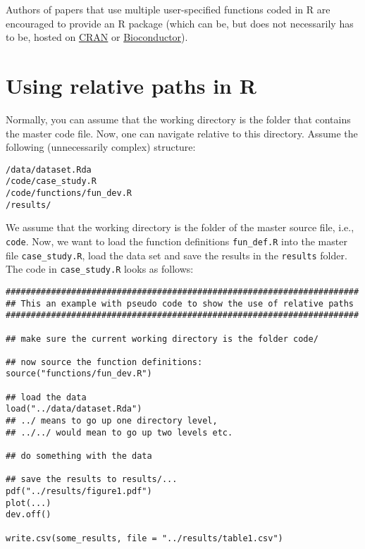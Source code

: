 \documentclass[12pt,a4paper]{article}
\begin{document}
Authors of papers that use multiple user-specified functions coded in \textsf{R}
are encouraged to provide an \textsf{R} package (which can be, but does not
necessarily has to be, hosted on \href{http://cran.r-project.org/}{CRAN} or
\href{http://bioconductor.org/}{Bioconductor}).





\clearpage
\appendix
\section{Using relative paths in R}
\label{sec:using-relative-paths}

Normally, you can assume that the working directory is the folder that contains
the master code file. Now, one can navigate relative to this directory. Assume
the following (unnecessarily complex) structure:

\begin{verbatim}
/data/dataset.Rda
/code/case_study.R
/code/functions/fun_dev.R
/results/
\end{verbatim}    

We assume that the working directory is the folder of the master source
file, i.e., \texttt{code}. Now, we want to load the function definitions
\texttt{fun\_def.R} into the master file \texttt{case\_study.R}, load the
data set and save the results in the \texttt{results} folder. The code in
\texttt{case\_study.R} looks as follows:

\begin{Verbatim}[frame=single]
######################################################################
## This an example with pseudo code to show the use of relative paths
######################################################################

## make sure the current working directory is the folder code/

## now source the function definitions:
source("functions/fun_dev.R")

## load the data 
load("../data/dataset.Rda")
## ../ means to go up one directory level, 
## ../../ would mean to go up two levels etc.

## do something with the data

## save the results to results/...
pdf("../results/figure1.pdf")
plot(...)
dev.off()

write.csv(some_results, file = "../results/table1.csv")
\end{Verbatim}  
\end{document}
